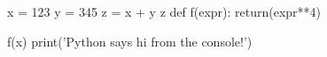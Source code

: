 \documentclass[12pt]{scrartcl}
\begin{document}
\begin{pyconsole}[][frame=single]
x = 123
y = 345
z = x + y
z
def f(expr):
    return(expr**4)

f(x)
print('Python says hi from the console!')
\end{pyconsole}
\end{document}
